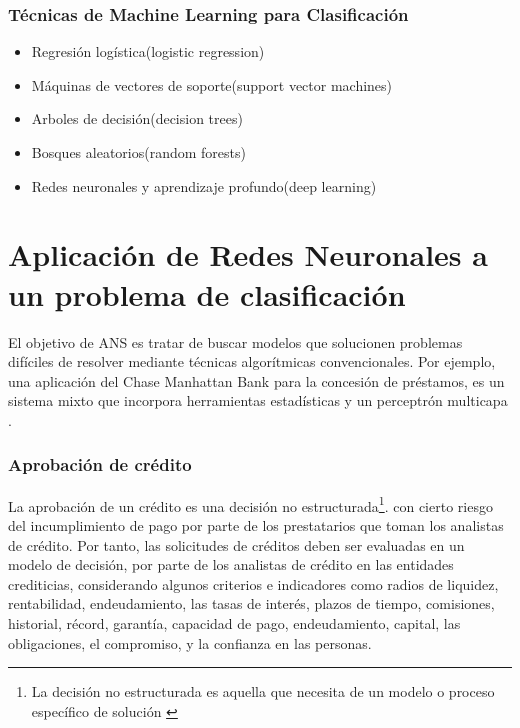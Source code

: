 \documentclass[11pt,titlepage]{report}
\begin{document}
\subsection{Técnicas de Machine Learning para Clasificación}
 \begin{itemize}
\item Regresión logística(logistic regression)
\item Máquinas de vectores de soporte(support vector machines)
\item Arboles de decisión(decision trees)
\item Bosques aleatorios(random forests)
\item Redes neuronales y aprendizaje profundo(deep learning)
\end{itemize}

\chapter{Aplicación de Redes Neuronales a un problema de clasificación}
El objetivo de ANS es tratar de buscar modelos que solucionen problemas difíciles de resolver mediante técnicas algorítmicas convencionales. Por ejemplo, una aplicación del Chase Manhattan Bank para la concesión de préstamos, es un sistema mixto que incorpora herramientas estadísticas y un perceptrón multicapa \cite{Guia17}.

\subsection{Aprobación de crédito}
La aprobación de un crédito es una decisión no estructurada\footnote{La decisión no estructurada es aquella que necesita de un modelo o proceso específico de solución \cite{Int08}}. con cierto riesgo del incumplimiento de pago por parte de los prestatarios que toman los analistas de crédito. Por tanto, las solicitudes de créditos deben ser evaluadas en un modelo de decisión, por parte de los analistas de crédito en las entidades crediticias, considerando algunos criterios e indicadores como radios de liquidez, rentabilidad, endeudamiento, las tasas de interés, plazos de tiempo, comisiones, historial, récord, garantía, capacidad de pago, endeudamiento, capital, las obligaciones, el compromiso, y la confianza en las personas.\\
\end{document}
